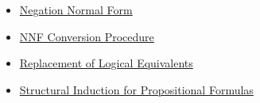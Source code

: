 \begin{dependencies}
\begin{itemize}
  \item \hyperref[def:negation-normal-form-propositional-logic]{Negation Normal Form}
  \item \hyperref[def:nnf-conversion-procedure-propositional-logic]{NNF Conversion Procedure}
  \item \hyperref[thm:replacement-of-logical-equivalents-propositional-logic]{Replacement of Logical Equivalents}
  \item \hyperref[thm:structural-induction-propositional-formulas]{Structural Induction for Propositional Formulas}
\end{itemize}
\end{dependencies}
